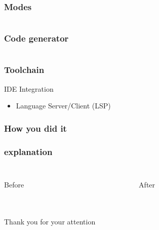 \documentclass{beamer}
\begin{document}
\begin{frame}
\frametitle{Modes}
\inputminted{swift}{code/modes.flint}
\end{frame}


\begin{frame}
\frametitle{Code generator}
\inputminted[fontsize=\tiny]{swift}{code/codegen.flint}
\end{frame}

\begin{frame}
\frametitle{Toolchain}
\begin{block}{IDE Integration}
	{\tiny
	\begin{itemize}
		\item Language Server/Client (LSP)
	\end{itemize}
	}
\end{block}
\end{frame}



\begin{frame}
\frametitle{How you did it}

\end{frame}

\begin{frame}
\frametitle{explanation}
\begin{columns}
\begin{column}{0.5\textwidth}
	\inputminted{swift}{code/example.flont}
	Before
\end{column}
\begin{column}{0.5\textwidth}  %
	\inputminted{swift}{code/example.flont}
	After
\end{column}
\end{columns}
\end{frame}

\section*{ }
\begin{frame}
 	\vbox{}
	\begin{centering}
	{\LARGE {} Thank you for your attention}
	\par
	\end{centering}
\end{frame}
\end{document}
